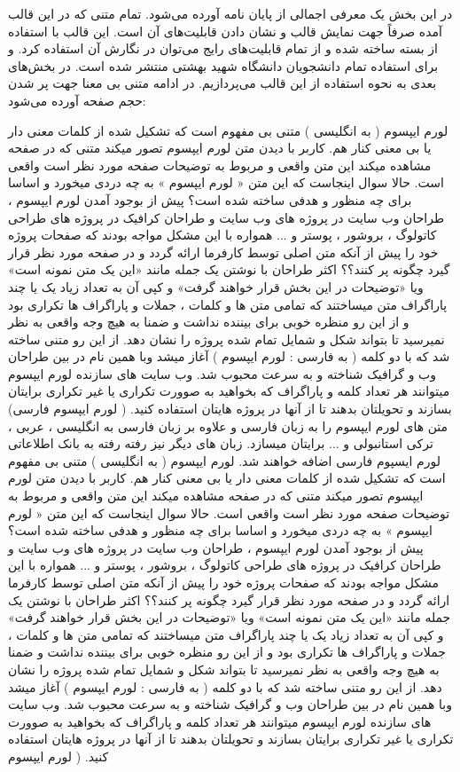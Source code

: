 در این بخش یک معرفی اجمالی از پایان نامه آورده می‌شود. تمام متنی که در این قالب آمده صرفاً جهت نمایش قالب و نشان دادن قابلیت‌های آن است.
این قالب با استفاده از بسته 
ساخته شده و از تمام قابلیت‌های رایج  می‌توان در نگارش آن استفاده کرد. و برای استفاده تمام دانشجویان دانشگاه شهید بهشتی منتشر شده است.
در بخش‌‌های بعدی به نحوه استفاده از این قالب می‌پردازیم. در ادامه متنی بی معنا جهت پر شدن حجم صفحه آورده می‌شود:

لورم ایپسوم ( به انگلیسی  ) متنی بی مفهوم است که تشکیل شده از کلمات معنی دار یا بی معنی کنار هم. کاربر با دیدن متن لورم ایپسوم تصور میکند متنی که در صفحه مشاهده میکند این متن واقعی و مربوط به توضیحات صفحه مورد نظر است واقعی است. حالا سوال اینجاست که این متن « لورم ایپسوم » به چه دردی میخورد و اساسا برای چه منظور و هدفی ساخته شده است؟ پیش از بوجود آمدن لورم ایپسوم ، طراحان وب سایت در پروژه های وب سایت و طراحان کرافیک در پروژه های طراحی کاتولوگ ، بروشور ، پوستر و ... همواره با این مشکل مواجه بودند که صفحات پروژه خود را پیش از آنکه متن اصلی توسط کارفرما ارائه گردد و در صفحه مورد نظر قرار گیرد چگونه پر کنند؟؟ اکثر طراحان با نوشتن یک جمله مانند «این یک متن نمونه است» ویا «توضیحات در این بخش قرار خواهند گرفت» و کپی آن به تعداد زیاد یک یا چند پاراگراف متن میساختند که تمامی متن ها و کلمات ، جملات و پاراگراف ها تکراری بود و از این رو منظره خوبی برای بیننده نداشت و ضمنا به هیچ وجه واقعی به نظر نمیرسید تا بتواند شکل و شمایل تمام شده پروژه را نشان دهد. از این رو متنی ساخته شد که با دو کلمه ( به فارسی : لورم ایپسوم ) آغاز میشد وبا همین نام در بین طراحان وب و گرافیک شناخته و به سرعت محبوب شد. وب سایت های سازنده لورم ایپسوم میتوانند هر تعداد کلمه و پاراگراف که بخواهید به صوورت تکراری یا غیر تکراری برایتان بسازند و تحویلتان بدهند تا از آنها در پروژه هایتان استفاده کنید. ( لورم ایپسوم فارسی) متن های لورم ایپسوم را به زبان فارسی و علاوه بر زبان فارسی به انگلیسی ، عربی ، ترکی استانبولی و ... برایتان میسازد. زبان های دیگر نیز رفته رفته به بانک اطلاعاتی لورم ایسپوم فارسی اضافه خواهند شد.  لورم ایپسوم ( به انگلیسی  ) متنی بی مفهوم است که تشکیل شده از کلمات معنی دار یا بی معنی کنار هم. کاربر با دیدن متن لورم ایپسوم تصور میکند متنی که در صفحه مشاهده میکند این متن واقعی و مربوط به توضیحات صفحه مورد نظر است واقعی است. حالا سوال اینجاست که این متن « لورم ایپسوم » به چه دردی میخورد و اساسا برای چه منظور و هدفی ساخته شده است؟ پیش از بوجود آمدن لورم ایپسوم ، طراحان وب سایت در پروژه های وب سایت و طراحان کرافیک در پروژه های طراحی کاتولوگ ، بروشور ، پوستر و ... همواره با این مشکل مواجه بودند که صفحات پروژه خود را پیش از آنکه متن اصلی توسط کارفرما ارائه گردد و در صفحه مورد نظر قرار گیرد چگونه پر کنند؟؟ اکثر طراحان با نوشتن یک جمله مانند «این یک متن نمونه است» ویا «توضیحات در این بخش قرار خواهند گرفت» و کپی آن به تعداد زیاد یک یا چند پاراگراف متن میساختند که تمامی متن ها و کلمات ، جملات و پاراگراف ها تکراری بود و از این رو منظره خوبی برای بیننده نداشت و ضمنا به هیچ وجه واقعی به نظر نمیرسید تا بتواند شکل و شمایل تمام شده پروژه را نشان دهد. از این رو متنی ساخته شد که با دو کلمه ( به فارسی : لورم ایپسوم ) آغاز میشد وبا همین نام در بین طراحان وب و گرافیک شناخته و به سرعت محبوب شد. وب سایت های سازنده لورم ایپسوم میتوانند هر تعداد کلمه و پاراگراف که بخواهید به صوورت تکراری یا غیر تکراری برایتان بسازند و تحویلتان بدهند تا از آنها در پروژه هایتان استفاده کنید. ( لورم ایپسوم 